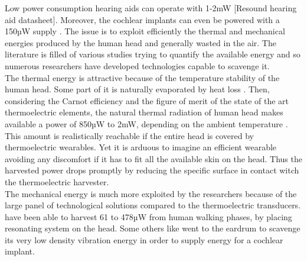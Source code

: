 \documentclass[3p,twocolumn,preprint]{elsarticle}
\begin{document}
Low power consumption hearing aids can operate with 1-2mW [Resound hearing aid datasheet].
Moreover, the cochlear implants can even be powered with a 150µW supply \cite{Cadei2014}. The issue is to exploit efficiently the thermal and mechanical energies produced by the human head and generally wasted in the air. The literature is filled of various studies trying to quantify the available energy and so numerous researchers have developed technologies capable to scavenge it.\\
The thermal energy is attractive because of the temperature stability of the human head. Some part of it is naturally evaporated by heat loss \cite{Starner1996}. Then, considering the Carnot efficiency and the figure of merit of the state of the art thermoelectric elements, the natural thermal radiation of human head makes available a power of 850µW to 2mW, depending on the ambient temperature \cite{Goll2011}. This amount is realistically reachable if the entire head is covered by thermoelectric wearables. Yet it is arduous to imagine an efficient wearable avoiding any discomfort if it has to fit all the available skin on the head. Thus the harvested power drops promptly by reducing the specific surface in contact witch the thermoelectric harvester.\\ 
The mechanical energy is much more exploited by the researchers because of the large panel of technological solutions compared to the thermoelectric transducers. \cite{Smilek2016} have been able to harvest 61 to 478µW from human walking phases, by placing resonating system on the head. Some others like \cite{Chaudhuri2017} went to the eardrum to scavenge its very low density vibration energy in order to supply energy for a cochlear implant.
\end{document}
